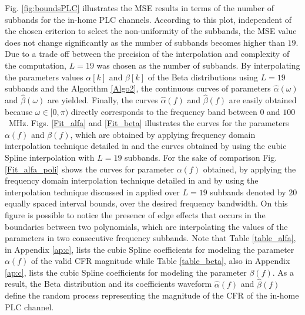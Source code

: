 Fig. \ref{fig:boundsPLC} illustrates the \ac{MSE} results in terms of the number of subbands for the in-home \ac{PLC} channels. According to this plot, independent of the chosen criterion to select the non-uniformity of the subbands, the \ac{MSE} value does not change significantly as the number of subbands becomes higher than $19$. Due to a trade off between the precision of the interpolation and complexity of the computation, $L=19$ was chosen as the number of subbands. By interpolating the parameters values $\alpha[k]$ and $\beta[k]$ of the Beta distributions using $L=19$ subbands and the Algorithm \ref{Algo2}, the continuous curves of parameters $\hat{\alpha}(\omega)$ and $\hat{\beta}(\omega)$ are yielded. Finally, the curves $\hat{\alpha}(f)$ and $\hat{\beta}(f)$ are easily obtained because $\omega \in [0,\pi)$ directly corresponds to the frequency band between $0$ and $100$~MHz. Figs. \ref{Fit_alfa} and \ref{Fit_beta} illustrates the curves for the parameters $\alpha(f)$ and $\beta(f)$, which are obtained by applying frequency domain interpolation technique detailed in \cite{mitra} and the curves obtained by using the cubic Spline interpolation with $L=19$ subbands. For the sake of comparison Fig. \ref{Fit_alfa_poli} shows the curves for parameter $\alpha(f)$ obtained, by applying the frequency domain interpolation technique detailed in \cite{mitra} and by using the interpolation technique discussed in \cite{Luis:AI} applied over $L=19$ subbands denoted by $20$ equally spaced interval bounds, over the desired frequency bandwidth. On this figure is possible to notice the presence of edge effects that occurs in the boundaries between two polynomials, which are interpolating the values of the parameters in two consecutive frequency subbands. Note that Table \ref{table_alfa}, in Appendix \ref{ap:c}, lists the cubic Spline coefficients for modeling the parameter $\alpha(f)$ of the valid \ac{CFR} magnitude while Table \ref{table_beta}, also in  Appendix \ref{ap:c}, lists the cubic Spline coefficients for modeling the parameter $\beta(f)$. As a result, the Beta distribution and its coefficients waveform  $\hat{\alpha}(f)$ and $\hat{\beta}(f)$ define the random process representing the magnitude of the \ac{CFR} of the in-home \ac{PLC} channel.
  
